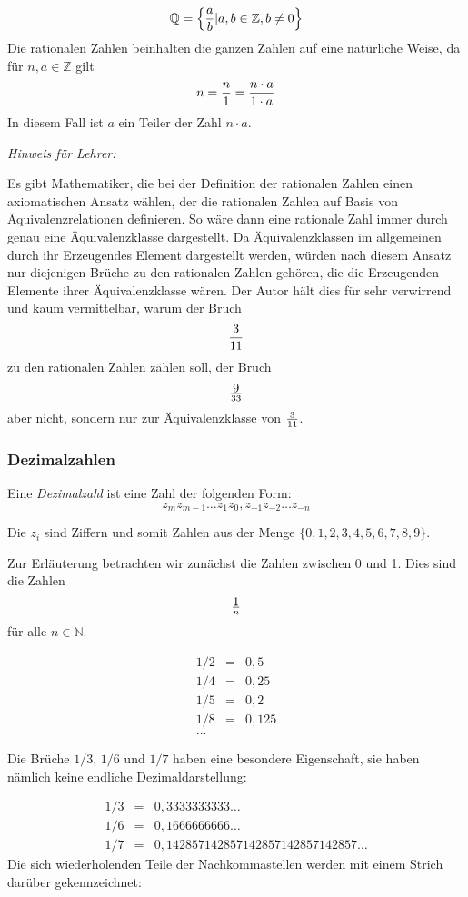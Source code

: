 \[ \mathbb{Q} = \left\{ {a\over b} \vert a,b \in \mathbb{Z}, b\ne 0 \right\} \]
Die rationalen Zahlen beinhalten die ganzen Zahlen auf eine natürliche Weise, da für $n,a\in \mathbb{Z}$ gilt
\[ n = {n \over 1} = {n \cdot a \over 1\cdot a}\]
In diesem Fall ist $a$ ein Teiler der Zahl $n\cdot a$. 

\begin{svgraybox}
\textsl{Hinweis für Lehrer:}

Es gibt Mathematiker, die bei der Definition der rationalen Zahlen einen axiomatischen Ansatz wählen, der die rationalen Zahlen auf Basis von Äquivalenzrelationen definieren. So wäre dann eine rationale Zahl immer durch genau eine Äquivalenzklasse dargestellt. Da Äquivalenzklassen im allgemeinen durch ihr Erzeugendes Element dargestellt werden, würden nach diesem Ansatz nur diejenigen Brüche zu den rationalen Zahlen gehören, die die Erzeugenden Elemente ihrer Äquivalenzklasse wären. Der Autor hält dies für sehr verwirrend und kaum vermittelbar, warum der Bruch 
\[ {3\over 11}\]
zu den rationalen Zahlen zählen soll, der Bruch
\[ 9\over 33\]
aber nicht, sondern nur zur Äquivalenzklasse von $3\over 11$.
\end{svgraybox}

\subsubsection{Dezimalzahlen}

\begin{definition}
Eine \textsl{Dezimalzahl} ist eine Zahl der folgenden Form:
\[ z_m z_{m-1} \dots z_1 z_0, z_{-1} z_{-2} \dots z_{-n} \]
\end{definition}
Die $z_i$ sind Ziffern und somit Zahlen aus der Menge $\{0,1,2,3,4,5,6,7,8,9\}$.

Zur Erläuterung betrachten wir zunächst die Zahlen zwischen 0 und 1. Dies sind die Zahlen 
\[ 1 \over n\] für alle $n\in \mathbb{N}$. 

\begin{eqnarray*}
1/2 &=& 0,5 \\
1/4 &=& 0,25 \\
1/5 &=& 0,2 \\
1/8 &=& 0,125 \\
\dots
\end{eqnarray*}

Die Brüche $1/3$, $1/6$ und $1/7$ haben eine besondere Eigenschaft, sie haben nämlich keine endliche Dezimaldarstellung:

\begin{eqnarray*}
1/3 &=& 0,3333333333\dots \\
1/6 &=& 0,1666666666\dots \\
1/7 &=& 0,142857142857142857142857142857\dots
\end{eqnarray*}
Die sich wiederholenden Teile der Nachkommastellen werden mit einem Strich darüber gekennzeichnet:

